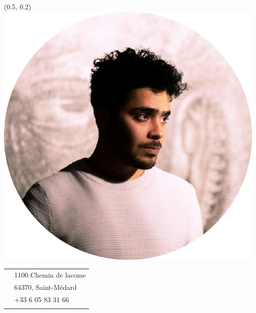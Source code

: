 \documentclass[]{friggeri-cv}
\begin{document}
\begin{textblock}{6}(0.5, 0.2)
\includegraphics[scale=0.18]{img/mdellabani}


  \begin{tabular}{c p{5cm}}
    \raisebox{-6pt}{\Large{\textifsymbol{18} $\quad$}} &  \small{ 1100 Chemin de lacome} \\ %
    \vspace*{2mm}
    \raisebox{-4pt}{} & \small{64370, Saint-Médard} \\ %
    \raisebox{-1pt}{\hspace{-1mm}\Large{\faMobile}$\quad$} & \small{+33 6 05 83 31 66} \\ %
    \vspace*{0.5mm}
  \end{tabular}
  \newline
  \hspace*{10mm}\href{mailto:mahieddine.dellabani@gmail.com}{\Large{\textcolor{yt}{\faAt}}$\quad$}  \href{https://www.linkedin.com/in/mdellabani}{{\Large{\textcolor{linkedin}\faLinkedinSquare}$\quad$}} \href{https://github.com/mdellabani}{\Large{\textcolor{black}\faGithub}}
  

\end{textblock}
\end{document}
